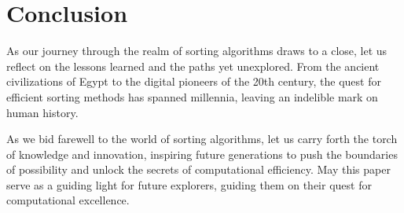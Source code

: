 \documentclass{article}
\begin{document}
\section{Conclusion}

As our journey through the realm of sorting algorithms draws to a close, let us reflect on the lessons learned and the paths yet unexplored. From the ancient civilizations of Egypt to the digital pioneers of the 20th century, the quest for efficient sorting methods has spanned millennia, leaving an indelible mark on human history.

As we bid farewell to the world of sorting algorithms, let us carry forth the torch of knowledge and innovation, inspiring future generations to push the boundaries of possibility and unlock the secrets of computational efficiency. May this paper serve as a guiding light for future explorers, guiding them on their quest for computational excellence.
\end{document}
